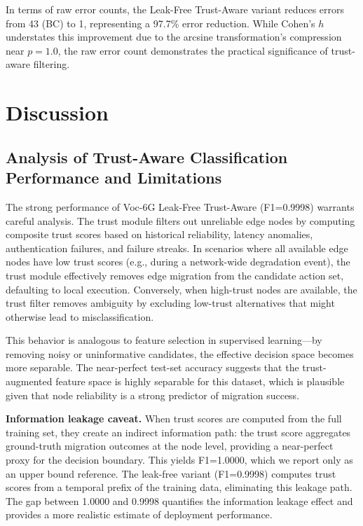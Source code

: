 \documentclass[journal,twoside]{IEEEtran}
\newcommand{\VocSixG}{Voc-6G}
\begin{document}
In terms of raw error counts, the Leak-Free Trust-Aware variant reduces errors from 43 (BC) to 1, representing a 97.7\% error reduction. While Cohen's $h$ understates this improvement due to the arcsine transformation's compression near $p=1.0$, the raw error count demonstrates the practical significance of trust-aware filtering.


\section{Discussion}
\label{sec:discussion}

\subsection{Analysis of Trust-Aware Classification Performance and Limitations}

The strong performance of \VocSixG{} Leak-Free Trust-Aware (F1=0.9998) warrants careful analysis. The trust module filters out unreliable edge nodes by computing composite trust scores based on historical reliability, latency anomalies, authentication failures, and failure streaks. In scenarios where all available edge nodes have low trust scores (e.g., during a network-wide degradation event), the trust module effectively removes edge migration from the candidate action set, defaulting to local execution. Conversely, when high-trust nodes are available, the trust filter removes ambiguity by excluding low-trust alternatives that might otherwise lead to misclassification.

This behavior is analogous to feature selection in supervised learning---by removing noisy or uninformative candidates, the effective decision space becomes more separable. The near-perfect test-set accuracy suggests that the trust-augmented feature space is highly separable for this dataset, which is plausible given that node reliability is a strong predictor of migration success.

\textbf{Information leakage caveat.} When trust scores are computed from the full training set, they create an indirect information path: the trust score aggregates ground-truth migration outcomes at the node level, providing a near-perfect proxy for the decision boundary. This yields F1=1.0000, which we report only as an upper bound reference. The leak-free variant (F1=0.9998) computes trust scores from a temporal prefix of the training data, eliminating this leakage path. The gap between 1.0000 and 0.9998 quantifies the information leakage effect and provides a more realistic estimate of deployment performance.
\end{document}
